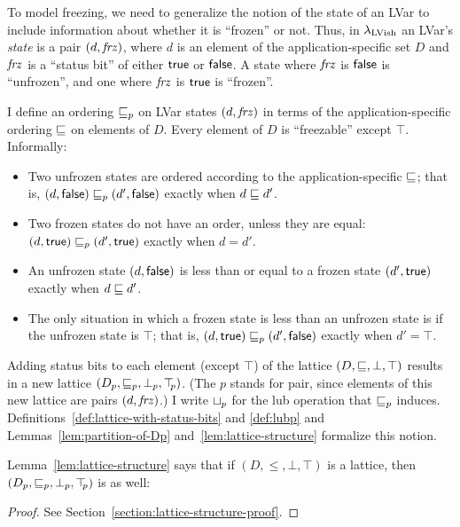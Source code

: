 To model freezing, we need to generalize the notion of the state of an
LVar to include information about whether it is ``frozen'' or not.
Thus, in $\lambda_{\textrm{LVish}}$ an LVar's \emph{state} is a pair
$(d, \mathit{frz})$, where $d$ is an element of the
application-specific set $D$ and $\mathit{frz}$ is a ``status bit'' of
either $\textsf{true}$ or $\textsf{false}$.  A state where $\mathit{frz}$ is
$\textsf{false}$ is ``unfrozen'', and one where $\mathit{frz}$ is
$\textsf{true}$ is ``frozen''.

I define an ordering $\sqsubseteq_p$ on LVar states $(d, \mathit{frz})$ in
terms of the application-specific ordering $\sqsubseteq$ on elements of
$D$.  Every element of $D$ is ``freezable'' except $\top$.
Informally:
\begin{itemize}
\item Two unfrozen states are ordered according to the
  application-specific $\sqsubseteq$; that is, $(d, \textsf{false})
  \sqsubseteq_p (d', \textsf{false})$ exactly when $d \sqsubseteq d'$.
\item Two frozen states do not have an order, unless they are equal:
  $(d, \textsf{true}) \sqsubseteq_p (d', \textsf{true})$ exactly when
  $d = d'$.
\item An unfrozen state $(d, \textsf{false})$ is less than or
  equal to a frozen state $(d', \textsf{true})$ exactly when $d
  \sqsubseteq d'$.
\item The only situation in which a frozen state is less than an
  unfrozen state is if the unfrozen state is $\top$; that is,
  $(d, \textsf{true}) \sqsubseteq_p (d', \textsf{false})$ exactly when
  $d' = \top$.
\end{itemize}
Adding status bits to each element (except $\top$) of the lattice $(D,
\sqsubseteq, \bot, \top)$ results in a new lattice $(D_p, \sqsubseteq_p, \bot_{p},
\top\hspace{-0.85mm}_{p})$.  (The $p$ stands for pair, since elements of this new lattice
are pairs $(d, \mathit{frz})$.) I write $ \sqcup_p $ for the lub
operation that $\sqsubseteq_p$ induces.
Definitions~\ref{def:lattice-with-status-bits} and \ref{def:lubp} and
Lemmas~\ref{lem:partition-of-Dp} and~\ref{lem:lattice-structure}
formalize this notion.

\DefLatticeWithStatusBits

\LemPartitionOfDp

\DefLubP

Lemma~\ref{lem:lattice-structure} says that if $(D, \leq, \bot, \top)$
is a lattice, then $(D_p, \sqsubseteq_p, \bot_{p}, \top\hspace{-0.85mm}_{p})$ is as well:

\LemLatticeStructure
\begin{proof}
See Section~\ref{section:lattice-structure-proof}.
\end{proof}

